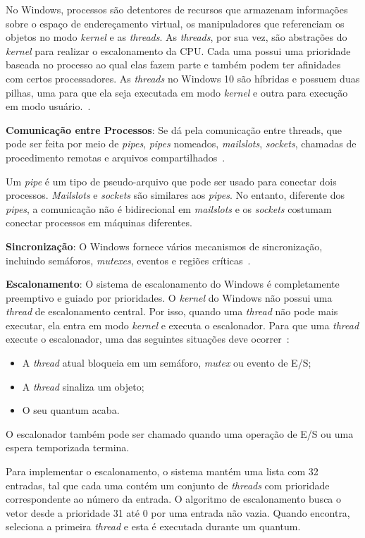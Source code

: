 No Windows, processos são detentores de recursos que armazenam informações sobre o espaço de endereçamento virtual, os manipuladores que referenciam os objetos no modo \emph{kernel} e as \emph{threads}. As \emph{threads}, por sua vez, são abstrações do \emph{kernel} para realizar o escalonamento da CPU. Cada uma possui uma prioridade baseada no processo ao qual elas fazem parte e também podem ter afinidades com certos processadores. As \emph{threads} no Windows 10 são híbridas e possuem duas pilhas, uma para que ela seja executada em modo \emph{kernel} e outra para execução em modo usuário.~\cite{tanenbaum}.

\textbf{Comunicação entre Processos}: Se dá pela comunicação entre threads, que pode ser feita por meio de \emph{pipes}, \emph{pipes} nomeados, \emph{mailslots}, \emph{sockets}, chamadas de procedimento remotas e arquivos compartilhados~\cite{tanenbaum}.

Um \emph{pipe} é um tipo de pseudo-arquivo que pode ser usado para conectar dois processos. \emph{Mailslots} e \emph{sockets} são similares aos \emph{pipes}. No entanto, diferente dos \emph{pipes}, a comunicação não é bidirecional em \emph{mailslots} e os \emph{sockets} costumam conectar processos em máquinas diferentes. 

\textbf{Sincronização}: O Windows fornece vários mecanismos de sincronização, incluindo semáforos, \emph{mutexes}, eventos e regiões críticas~\cite{tanenbaum}.

\textbf{Escalonamento}: O sistema de escalonamento do Windows é completamente preemptivo e guiado por prioridades.
O \emph{kernel} do Windows não possui uma \emph{thread} de escalonamento central. Por isso, quando uma \emph{thread} não pode mais executar, ela entra em modo \emph{kernel} e executa o escalonador. Para que uma \emph{thread} execute o escalonador, uma das seguintes situações deve ocorrer~\cite{tanenbaum}:
\begin{itemize}
	\item A \emph{thread} atual bloqueia em um semáforo, \emph{mutex} ou evento de E/S;
	\item A \emph{thread} sinaliza um objeto;
	\item O seu quantum acaba.
\end{itemize}

O escalonador também pode ser chamado quando uma operação de E/S ou uma espera temporizada termina.

Para implementar o escalonamento, o sistema mantém uma lista com 32 entradas, tal que cada uma contém um conjunto de \emph{threads} com prioridade correspondente ao número da entrada. O algoritmo de escalonamento busca o vetor desde a prioridade 31 até 0 por uma entrada não vazia. Quando encontra, seleciona a primeira \emph{thread} e esta é executada durante um quantum. 

